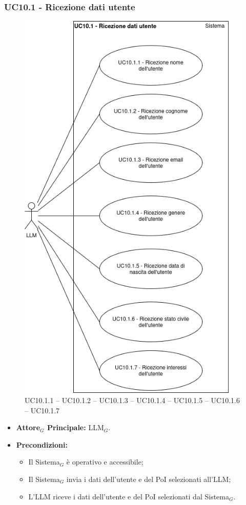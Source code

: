 \documentclass[10pt]{article}
\begin{document}
\begin{justify}
\subsubsection{\textbf{UC10.1 - Ricezione dati utente}}
\begin{figure}[H]
    \centering
    \includegraphics[width=0.7\linewidth]{UC10.1image.png}
    \caption{UC10.1.1 -- UC10.1.2 -- UC10.1.3 -- UC10.1.4 -- UC10.1.5 -- UC10.1.6 -- UC10.1.7}
    \label{fig:UC10.1}
\end{figure}
\label{UC10.1}
\begin{itemize}
    \item \textbf{Attore$_G$ Principale:} LLM$_G$.
    \item \textbf{Precondizioni:} 
        \begin{itemize}
          \item Il Sistema$_G$ è operativo e accessibile;
          \item Il Sistema$_G$ invia i dati dell'utente e del PoI selezionati all'LLM;
            \item L'LLM riceve i dati dell'utente e del PoI selezionati dal Sistema$_G$.

\end{itemize}
\end{itemize}
\end{justify}
\end{document}
